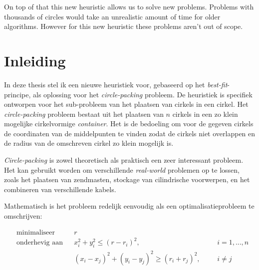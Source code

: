 \documentclass[12pt,a4paper,oneside]{book}
\begin{document}
On top of that this new heuristic allows us to solve new problems. 
Problems with thousands of circles would take an unrealistic amount of time for older algorithms.
However for this new heuristic these problems aren't out of scope.

\newpage

\tableofcontents
\listoffigures
{}
\listoftables
{}

\newpage

\setcounter{page}{0}

\chapter{Inleiding}

In deze thesis stel ik een nieuwe heuristiek voor, gebaseerd op het \textit{best-fit}-principe, als oplossing voor het \textit{circle-packing} probleem.
De heuristiek is specifiek ontworpen voor het sub-probleem van het plaatsen van cirkels in een cirkel.
Het \textit{circle-packing} probleem bestaat uit het plaatsen van $n$ cirkels in een zo klein mogelijke cirkelvormige \textit{container}.
Het is de bedoeling om voor de gegeven cirkels de coordinaten van de middelpunten te vinden zodat de cirkels niet overlappen en de radius van de omschreven cirkel zo klein mogelijk is.

\textit{Circle-packing} is zowel theoretisch als praktisch een zeer interessant probleem.
Het kan gebruikt worden om verschillende \textit{real-world} problemen op te lossen, zoals het plaatsen van zendmasten, stockage van cilindrische voorwerpen, en het combineren van verschillende kabels. 

Mathematisch is het probleem redelijk eenvoudig als een optimalisatieprobleem te omschrijven:

\begin{equation*}
\begin{aligned}
& \text{minimaliseer}
& & r \\
& \text{onderhevig aan}
& & x_i^2 + y_i^2 \leq (r-r_i)^2, 
& & &i = {1,...,n}\\
&&& (x_i - x_j)^2 + (y_i - y_j)^2 \geq (r_i + r_j)^2,
& & &i \neq j
\end{aligned}
\end{equation*}
\end{document}
